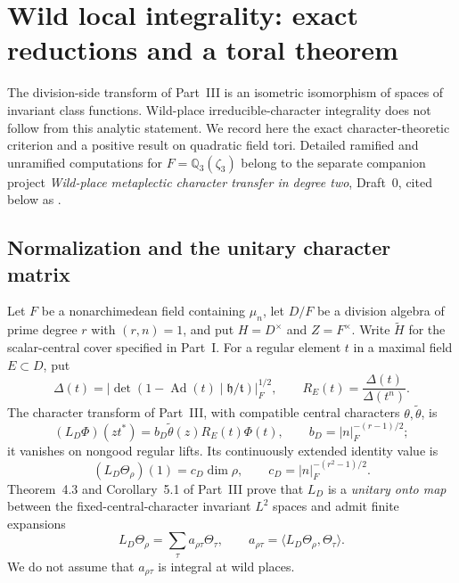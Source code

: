 \documentclass[11pt]{article}
\newcommand{\tH}{\widetilde H}
\theoremstyle{plain}
\theoremstyle{definition}
\begin{document}
\section{Wild local integrality: exact reductions and a toral theorem}\label{sec:wild}
The division-side transform of Part~III is an isometric isomorphism of
spaces of invariant class functions.  Wild-place irreducible-character
integrality does not follow from this analytic statement.  We record
here the exact character-theoretic criterion and a positive result on
quadratic field tori.  Detailed ramified and unramified computations
for $F=\mathbb Q_3(\zeta_3)$ belong to the separate companion project
\emph{Wild-place metaplectic character transfer in degree two},
Draft~0, cited below as \cite{RankTwo0}.

\subsection{Normalization and the unitary character matrix}\label{subsec:integral}
Let $F$ be a nonarchimedean field containing $\mu_n$, let $D/F$
be a division algebra of prime degree $r$ with $(r,n)=1$, and put
$H=D^\times$ and $Z=F^\times$.  Write $\tH$ for the scalar-central
cover specified in Part~I.  For a regular element $t$ in a maximal
field $E\subset D$, put
\begin{equation}\label{eq:Delta}
\Delta(t)=\left|\det(1-\operatorname{Ad}(t)\mid
\mathfrak h/\mathfrak t)\right|_F^{1/2},\qquad
R_E(t)=\frac{\Delta(t)}{\Delta(t^n)}.
\end{equation}
The character transform of Part~III, with compatible central
characters $\theta,\widetilde\theta$, is
\begin{equation}\label{eq:LD}
(L_D\Phi)(z t^*)=b_D\widetilde\theta(z)R_E(t)\Phi(t),
\qquad b_D=|n|_F^{-(r-1)/2};
\end{equation}
it vanishes on nongood regular lifts.  Its continuously extended
identity value is
\begin{equation}\label{eq:cD}
(L_D\Theta_\rho)(1)=c_D\dim\rho,\qquad
c_D=|n|_F^{-(r^2-1)/2}.
\end{equation}
Theorem~4.3 and Corollary~5.1 of Part~III prove that $L_D$ is a
\emph{unitary onto map} between the fixed-central-character invariant
$L^2$ spaces and admit finite expansions
\begin{equation}\label{eq:matrixchars}
L_D\Theta_\rho=\sum_\tau a_{\rho\tau}\Theta_\tau,
\qquad a_{\rho\tau}=\langle L_D\Theta_\rho,\Theta_\tau\rangle.
\end{equation}
We do not assume that $a_{\rho\tau}$ is integral at wild places.
\end{document}
